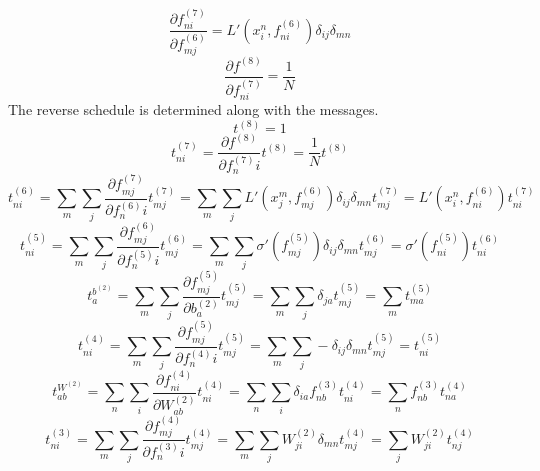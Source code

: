 \documentclass[fleqn]{report}
\begin{document}
\begin{equation}
    \frac{\partial f^{(7)}_{ni}}{\partial f^{(6)}_{mj}} = L'\left(x^n_i, f^{(6)}_{ni}\right) \delta_{ij} \delta_{mn}
\end{equation}
\begin{equation}
    \frac{\partial f^{(8)}}{\partial f^{(7)}_{ni}} = \frac{1}{N}
\end{equation}
The reverse schedule is determined along with the messages.
\begin{equation}
    t^{(8)} = 1
\end{equation}
\begin{equation}
    t^{(7)}_{ni} = \frac{\partial f^{(8)}}{\partial f^{(7)}_ni} t^{(8)} = \frac{1}{N} t^{(8)}
\end{equation}
\begin{equation}
    t^{(6)}_{ni} = \sum_m \sum_j \frac{\partial f^{(7)}_{mj}}{\partial f^{(6)}_ni} t^{(7)}_{mj} = \sum_m \sum_j L'\left(x^m_j, f^{(6)}_{mj}\right) \delta_{ij} \delta_{mn} t^{(7)}_{mj} = L'\left(x^n_i, f^{(6)}_{ni}\right) t^{(7)}_{ni}
\end{equation}
\begin{equation}
    t^{(5)}_{ni} = \sum_m \sum_j \frac{\partial f^{(6)}_{mj}}{\partial f^{(5)}_ni} t^{(6)}_{mj} = \sum_m \sum_j \sigma'\left(f^{(5)}_{mj}\right) \delta_{ij} \delta_{mn} t^{(6)}_{mj} = \sigma'\left(f^{(5)}_{ni}\right) t^{(6)}_{ni}
\end{equation}
\begin{equation}
    t^{b^{(2)}}_{a} = \sum_m \sum_j \frac{\partial f^{(5)}_{mj}}{\partial b^{(2)}_a} t^{(5)}_{mj} = \sum_m \sum_j \delta_{ja} t^{(5)}_{mj} = \sum_m t^{(5)}_{ma}
\end{equation}
\begin{equation}
    t^{(4)}_{ni} = \sum_m \sum_j \frac{\partial f^{(5)}_{mj}}{\partial f^{(4)}_ni} t^{(5)}_{mj} = \sum_m \sum_j - \delta_{ij} \delta_{mn} t^{(5)}_{mj} = t^{(5)}_{ni}
\end{equation}
\begin{equation}
    t^{W^{(2)}}_{ab} = \sum_n \sum_i \frac{\partial f^{(4)}_{ni}}{\partial W^{(2)}_{ab}} t^{(4)}_{ni} = \sum_n \sum_i \delta_{ia} f^{(3)}_{nb} t^{(4)}_{ni} = \sum_n f^{(3)}_{nb} t^{(4)}_{na}
\end{equation}
\begin{equation}
    t^{(3)}_{ni} = \sum_m \sum_j \frac{\partial f^{(4)}_{mj}}{\partial f^{(3)}_ni} t^{(4)}_{mj} = \sum_m \sum_j W^{(2)}_{ji} \delta_{mn} t^{(4)}_{mj} = \sum_j W^{(2)}_{ji} t^{(4)}_{nj}
\end{equation}
\end{document}
